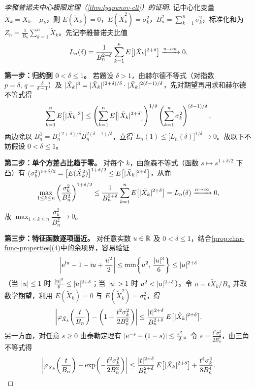 \begin{proof}[李雅普诺夫中心极限定理（\cref{thm:lyapunov-clt}）的证明]
记中心化变量 $\tilde{X}_k=X_k-\mu_k$，则 $E(\tilde{X}_k)=0$，$E(\tilde{X}_k^2)=\sigma_k^2$，$B_n^2=\sum_{k=1}^{n}\sigma_k^2$，标准化和为 $Z_n=\frac{1}{B_n}\sum_{k=1}^{n}\tilde{X}_k$。先记李雅普诺夫比值
\[
  L_n(\delta)=\frac{1}{B_n^{2+\delta}}\sum_{k=1}^{n}E\bigl[\lvert\tilde{X}_k\rvert^{2+\delta}\bigr]\xrightarrow{n\to\infty} 0.
\]

\textbf{第一步：归约到 $0<\delta\le 1$。} 若题设 $\delta>1$，由赫尔德不等式（对指数 $p=\delta,\,q=\frac{\delta}{\delta-1}$）及 $\lvert\tilde{X}_k\rvert^3=\lvert\tilde{X}_k\rvert^{(2+\delta)/\delta}\cdot\lvert\tilde{X}_k\rvert^{2(\delta-1)/\delta}$，先对期望再用求和赫尔德不等式得
\[
  \sum_{k=1}^{n}E\bigl[\lvert\tilde{X}_k\rvert^3\bigr]
  \le\left(\sum_{k=1}^{n}E\bigl[\lvert\tilde{X}_k\rvert^{2+\delta}\bigr]\right)^{1/\delta}
     \left(\sum_{k=1}^{n}\sigma_k^2\right)^{(\delta-1)/\delta},
\]
两边除以 $B_n^3=B_n^{(2+\delta)/\delta}B_n^{2(\delta-1)/\delta}$，立得 $L_n(1)\le\bigl[L_n(\delta)\bigr]^{1/\delta}\to 0$。故以下不妨假设 $0<\delta\le 1$。

\textbf{第二步：单个方差占比趋于零。} 对每个 $k$，由詹森不等式（函数 $s\mapsto s^{1+\delta/2}$ 下凸）有 $(\sigma_k^2)^{1+\delta/2}=\bigl[E(\tilde{X}_k^2)\bigr]^{1+\delta/2}\le E\bigl[\lvert\tilde{X}_k\rvert^{2+\delta}\bigr]$，从而
\[
  \max_{1\le k\le n}\left(\frac{\sigma_k^2}{B_n^2}\right)^{1+\delta/2}
  \le\frac{1}{B_n^{2+\delta}}\sum_{k=1}^{n}E\bigl[\lvert\tilde{X}_k\rvert^{2+\delta}\bigr]=L_n(\delta)\xrightarrow{n\to\infty} 0,
\]
故 $\max_{1\le k\le n}\dfrac{\sigma_k^2}{B_n^2}\to 0$。

\textbf{第三步：特征函数逐项逼近。} 对任意实数 $u\in\mathbb{R}$ 及 $0<\delta\le 1$，结合\cref{prop:char-func-properties}(4)中的余项界，容易验证
\[
  \left|\mathrm{e}^{\mathrm{i} u}-1-\mathrm{i} u+\frac{u^2}{2}\right|
  \le\min\!\left\{u^2,\,\frac{\lvert u\rvert^3}{6}\right\}
  \le\lvert u\rvert^{2+\delta}
\]
（当 $\lvert u\rvert\le 1$ 时 $\frac{\lvert u\rvert^3}{6}\le\lvert u\rvert^{2+\delta}$；当 $\lvert u\rvert>1$ 时 $u^2<\lvert u\rvert^{2+\delta}$）。令 $u=t\tilde{X}_k/B_n$ 并取数学期望，利用 $E(\tilde{X}_k)=0$ 与 $E(\tilde{X}_k^2)=\sigma_k^2$，得
\[
  \left|\varphi_{\tilde{X}_k}\!\left(\frac{t}{B_n}\right)-\left(1-\frac{t^2\sigma_k^2}{2B_n^2}\right)\right|
  \le\frac{\lvert t\rvert^{2+\delta}}{B_n^{2+\delta}}\,E\bigl[\lvert\tilde{X}_k\rvert^{2+\delta}\bigr].
\]
另一方面，对任意 $s\ge 0$ 由泰勒定理有 $\lvert\mathrm{e}^{-s}-(1-s)\rvert\le\frac{s^2}{2}$。令 $s=\frac{t^2\sigma_k^2}{2B_n^2}$，由三角不等式得
\[
  \left|\varphi_{\tilde{X}_k}\!\left(\frac{t}{B_n}\right)-\exp\!\left(-\frac{t^2\sigma_k^2}{2B_n^2}\right)\right|
  \le\frac{\lvert t\rvert^{2+\delta}}{B_n^{2+\delta}}\,E\bigl[\lvert\tilde{X}_k\rvert^{2+\delta}\bigr]
   +\frac{t^4\sigma_k^4}{8B_n^4}.
\]


\end{proof}
